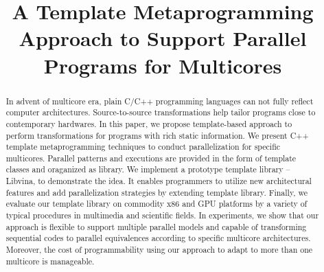 \documentclass[conference]{IEEEtran}
\begin{document}
\title{A Template Metaprogramming Approach to Support Parallel
  Programs for Multicores}


\author{
}
\maketitle


\begin{abstract}
In advent of multicore era, plain C/C++ programming languages can not
fully reflect computer architectures. Source-to-source
transformations help tailor programs close to contemporary
hardwares. In this paper, we propose template-based approach to perform 
transformations for programs with rich static information.
We present C++ template metaprogramming techniques to conduct
parallelization for specific
multicores. Parallel patterns and executions are provided in the form of
template classes and oraganized as library. We implement a prototype
template library -- Libvina, to demonstrate the idea. It enables
programmers to utilize new architectural
features and add parallelization strategies by extending template library. 
Finally, we evaluate our template library on
commodity x86 and GPU platforms by a variety of typical procedures
in multimedia and scientific fields. In experiments, we show that our
approach is flexible to support multiple parallel models and capable
of transforming sequential codes to parallel equivalences according to
specific multicore architectures. Moreover, the cost of programmability using our
approach to adapt to more than one multicore is manageable.
\end{abstract}

\IEEEpeerreviewmaketitle



%






%





\end{document}
